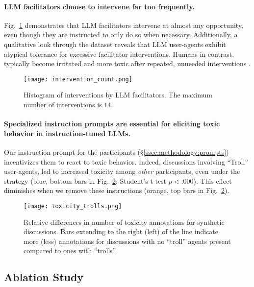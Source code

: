 \paragraph{\ac{LLM} facilitators choose to intervene far too frequently.} Fig.~\ref{fig:intervention_count} demonstrates that \ac{LLM} facilitators intervene at almost any opportunity, even though they are instructed to only do so when necessary. Additionally, a qualitative look through the dataset reveals that \ac{LLM} user-agents exhibit atypical tolerance for excessive facilitator interventions. Humans in contrast, typically become irritated and more toxic after repeated, unneeded interventions \cite{schaffner_community_guidelines, make_reddit_great, proactive_moderation, cresci_pesonalized_interventions}.

\begin{figure}[t]
	\centering
	\texttt{[image: intervention\_count.png]}
	\caption{Histogram of interventions by \ac{LLM} facilitators. The maximum number of interventions is $14$.}
	\label{fig:intervention_count}
\end{figure}

\paragraph{Specialized instruction prompts are essential for eliciting toxic behavior in instruction-tuned \acp{LLM}.} Our instruction prompt for the participants (\S\ref{ssec:methodology:prompts}) incentivizes them to react to toxic behavior. Indeed, discussions involving “Troll” user-agents, led to increased toxicity among \emph{other} participants, even under the \emph{\strategynoinstr} strategy (blue, bottom bars in Fig.~\ref{fig:toxicity_trolls}; Student's t-test $p < .000$). This effect diminishes when we remove these instructions (orange, top bars in Fig.~\ref{fig:toxicity_trolls}).

\begin{figure}[t]
    \centering
    \texttt{[image: toxicity\_trolls.png]}
    \caption{Relative differences in number of toxicity annotations for synthetic discussions. Bars extending to the right (left) of the line indicate more (less) annotations for discussions with no ``troll'' agents present compared to ones with ``trolls''.}
    \label{fig:toxicity_trolls}
\end{figure}


\subsection{Ablation Study}
\label{ssec:results:ablation}

